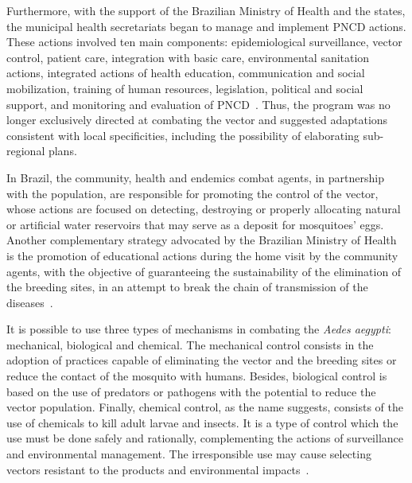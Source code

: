 Furthermore, with the support of the Brazilian Ministry of Health and the states, the municipal health secretariats began to manage and implement PNCD actions.
These actions involved ten main components: epidemiological surveillance, vector control, patient care, integration with basic care, environmental sanitation actions, integrated actions of health education, communication and social mobilization, training of human resources, legislation, political and social support, and monitoring and evaluation of PNCD~\cite{web:pncdbrasil}.
Thus, the program was no longer exclusively directed at combating the vector and suggested adaptations consistent with local specificities, including the possibility of elaborating sub-regional plans.

In Brazil, the community, health and endemics combat agents, in partnership with the population, are responsible for promoting the control of the vector, whose actions are focused on detecting, destroying or properly allocating natural or artificial water reservoirs that may serve as a deposit for mosquitoes' eggs.
Another complementary strategy advocated by the Brazilian Ministry of Health is the promotion of educational actions during the home visit by the community agents, with the objective of guaranteeing the sustainability of the elimination of the breeding sites, in an attempt to break the chain of transmission of the diseases~\cite{brasil2009diretrizes}.

It is possible to use three types of mechanisms in combating the {\it Aedes aegypti}: mechanical, biological and chemical.
The mechanical control consists in the adoption of practices capable of eliminating the vector and the breeding sites or reduce the contact of the mosquito with humans.
Besides, biological control is based on the use of predators or pathogens with the potential to reduce the vector population.
Finally, chemical control, as the name suggests, consists of the use of chemicals
to kill adult larvae and insects. It is a type of control which the use must be done safely and rationally, complementing the actions of surveillance and environmental management.
The irresponsible use may cause selecting vectors resistant to the products and environmental impacts~\cite{world1996chemicals}.

